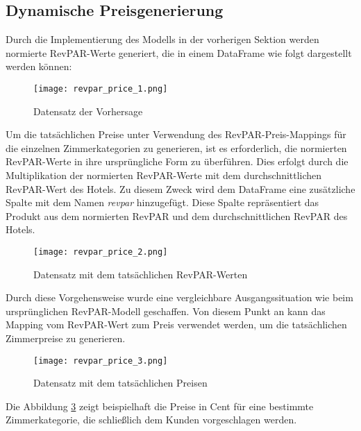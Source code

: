 \subsection{Dynamische Preisgenerierung}
\label{subsec:revpar_price}
Durch die Implementierung des Modells in der vorherigen Sektion werden normierte RevPAR-Werte generiert, die in einem DataFrame wie folgt dargestellt werden können:

\begin{figure}[h]
    \centering
    \texttt{[image: revpar\_price\_1.png]}
    \caption[Datensatz der Vorhersage]{Datensatz der Vorhersage}
    \label{img:revpar_price_1}
\end{figure}

Um die tatsächlichen Preise unter Verwendung des RevPAR-Preis-Mappings für die einzelnen Zimmerkategorien zu generieren, ist es erforderlich, die normierten RevPAR-Werte in ihre ursprüngliche Form zu überführen. Dies erfolgt durch die Multiplikation der normierten RevPAR-Werte mit dem durchschnittlichen RevPAR-Wert des Hotels. Zu diesem Zweck wird dem DataFrame eine zusätzliche Spalte mit dem Namen \emph{revpar} hinzugefügt. Diese Spalte repräsentiert das Produkt aus dem normierten RevPAR und dem durchschnittlichen RevPAR des Hotels.
\newpage
\begin{figure}[h]
    \centering
    \texttt{[image: revpar\_price\_2.png]}
    \caption[Datensatz mit dem tatsächlichen RevPAR-Werten]{Datensatz mit dem tatsächlichen RevPAR-Werten}
    \label{img:revpar_price_2}
\end{figure}

Durch diese Vorgehensweise wurde eine vergleichbare Ausgangssituation wie beim ursprünglichen RevPAR-Modell geschaffen. Von diesem Punkt an kann das Mapping vom RevPAR-Wert zum Preis verwendet werden, um die tatsächlichen Zimmerpreise zu generieren.

\begin{figure}[h]
    \centering
    \texttt{[image: revpar\_price\_3.png]}
    \caption[Datensatz mit dem tatsächlichen Preisen]{Datensatz mit dem tatsächlichen Preisen}
    \label{img:revpar_price_3}
\end{figure}

Die Abbildung \ref{img:revpar_price_3} zeigt beispielhaft die Preise in Cent für eine bestimmte Zimmerkategorie, die schließlich dem Kunden vorgeschlagen werden.
